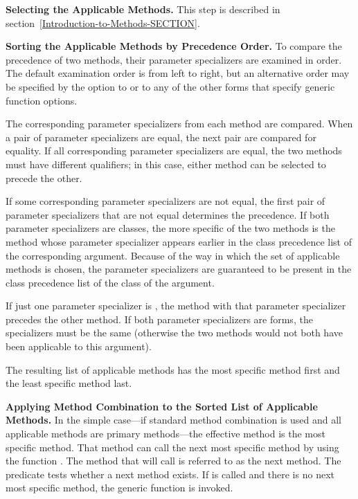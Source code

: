 {\bf Selecting the Applicable Methods.}
This step is described in section~\ref{Introduction-to-Methods-SECTION}.


{\bf Sorting the Applicable Methods by Precedence Order.}
To compare the precedence of two methods, their parameter specializers
are examined in order.  The default examination order is from left to
right, but an alternative order may be specified by the 
 option to  or to any of
the other forms that specify generic function options.

The corresponding parameter specializers from each method are
compared.  When a pair of parameter specializers are equal, the next
pair are compared for equality.  If all corresponding parameter
specializers are equal, the two methods must have different
qualifiers; in this case, either method can be selected to precede the
other.

If some corresponding parameter specializers are not equal, the first
pair of parameter specializers that are not equal determines the
precedence.  If both parameter specializers are classes, the more
specific of the two methods is the method whose parameter specializer
appears earlier in the class precedence list of the corresponding
argument.  Because of the way in which the set of applicable methods
is chosen, the parameter specializers are guaranteed to be present in
the class precedence list of the class of the argument.

If just one parameter specializer is , the method with that parameter specializer precedes the
other method.  If both parameter specializers are 
forms, the
specializers must be the same (otherwise the two methods would
not both have been applicable to this argument).

The resulting list of applicable methods has the most specific
method first and the least specific method last.    

{\bf Applying Method Combination to the Sorted List of Applicable Methods.}
In the simple case---if standard method combination is used and all
applicable methods are primary methods---the effective method is the
most specific method.  That method can call the next most specific
method by using the function .  The method that
 will call is referred to as the {\bit next
method}.  The predicate  tests whether a next
method exists.  If  is called and there is no
next most specific method, the generic function 
is invoked.

